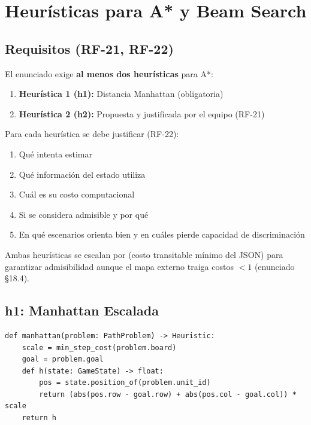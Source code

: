 \chapter{Heurísticas para A* y Beam Search}
\label{ch:heuristicas}

\section{Requisitos (RF-21, RF-22)}
\label{sec:requisitos-heuristicas}

El enunciado exige \textbf{al menos dos heurísticas} para A*:

\begin{enumerate}
\item \textbf{Heurística 1 (h1):} Distancia Manhattan (obligatoria)
\item \textbf{Heurística 2 (h2):} Propuesta y justificada por el equipo (RF-21)
\end{enumerate}

Para cada heurística se debe justificar (RF-22):
\begin{enumerate}
\item Qué intenta estimar
\item Qué información del estado utiliza
\item Cuál es su costo computacional
\item Si se considera admisible y por qué
\item En qué escenarios orienta bien y en cuáles pierde capacidad de discriminación
\end{enumerate}

Ambas heurísticas se escalan por  (costo transitable mínimo del JSON)
para garantizar admisibilidad aunque el mapa externo traiga costos $< 1$ (enunciado §18.4).

\section{h1: Manhattan Escalada}
\label{sec:h1}

\begin{verbatim}
def manhattan(problem: PathProblem) -> Heuristic:
    scale = min_step_cost(problem.board)
    goal = problem.goal
    def h(state: GameState) -> float:
        pos = state.position_of(problem.unit_id)
        return (abs(pos.row - goal.row) + abs(pos.col - goal.col)) * scale
    return h
\end{verbatim}


